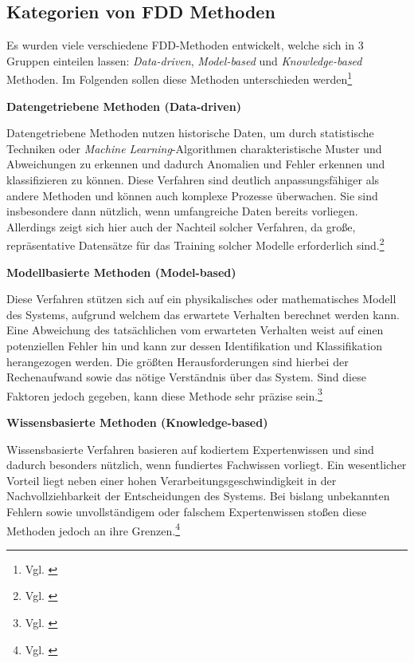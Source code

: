 \subsection[Kategorien von Fault Detection and Diagnostics (FDD) Methoden]{Kategorien von \ac{FDD} Methoden}
Es wurden viele verschiedene \ac{FDD}-Methoden entwickelt, welche sich in 3 Gruppen einteilen lassen: \textit{Data-driven}, \textit{Model-based} und \textit{Knowledge-based} Methoden. Im Folgenden sollen diese Methoden unterschieden werden\footnote{Vgl. \cite[S. 4]{seid_ahmed_advances_2025}}

\textbf{Datengetriebene Methoden (Data-driven)} 

Datengetriebene Methoden nutzen historische Daten, um durch statistische Techniken oder \textit{Machine Learning}-Algorithmen charakteristische Muster und Abweichungen zu erkennen und dadurch Anomalien und Fehler erkennen und klassifizieren zu können. Diese Verfahren sind deutlich anpassungsfähiger als andere Methoden und können auch komplexe Prozesse überwachen. Sie sind insbesondere dann nützlich, wenn umfangreiche Daten bereits vorliegen. Allerdings zeigt sich hier auch der Nachteil solcher Verfahren, da große, repräsentative Datensätze für das Training solcher Modelle erforderlich sind.\footnote{Vgl. \cite[S. 16 ff.]{mercorelli_recent_2024}}

\textbf{Modellbasierte Methoden (Model-based)}

Diese Verfahren stützen sich auf ein physikalisches oder mathematisches Modell des Systems, aufgrund welchem das erwartete Verhalten berechnet werden kann. Eine Abweichung des tatsächlichen vom erwarteten Verhalten weist auf einen potenziellen Fehler hin und kann zur dessen Identifikation und Klassifikation herangezogen werden. Die größten Herausforderungen sind hierbei der Rechenaufwand sowie das nötige Verständnis über das System. Sind diese Faktoren jedoch gegeben, kann diese Methode sehr präzise sein.\footnote{Vgl. \cite[S. 21 ff.]{mercorelli_recent_2024}}

\textbf{Wissensbasierte Methoden (Knowledge-based)} 

Wissensbasierte Verfahren basieren auf kodiertem Expertenwissen und sind dadurch besonders nützlich, wenn fundiertes Fachwissen vorliegt. Ein wesentlicher Vorteil liegt neben einer hohen Verarbeitungsgeschwindigkeit in der Nachvollziehbarkeit der Entscheidungen des Systems. Bei bislang unbekannten Fehlern sowie unvollständigem oder falschem Expertenwissen stoßen diese Methoden jedoch an ihre Grenzen.\footnote{Vgl. \cite[S. 22 f.]{mercorelli_recent_2024}}

